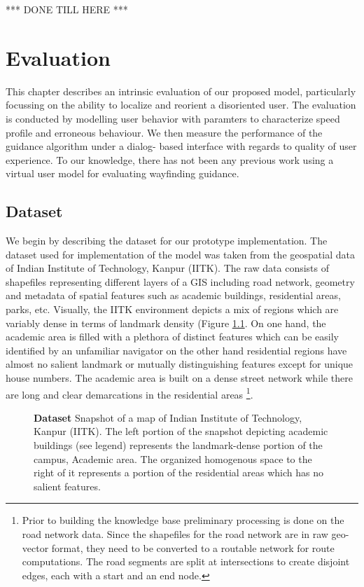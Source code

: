 \documentclass{iitkthesis}
\begin{document}
{*** DONE TILL HERE ***}
 \chapter{Evaluation}
This chapter describes an intrinsic evaluation of our proposed model, 
particularly focussing on the ability to localize and reorient a 
disoriented user. The evaluation is conducted by modelling user behavior 
with paramters to characterize speed profile and erroneous behaviour. We 
then measure the performance of the guidance algorithm under a dialog-
based interface with regards to quality of user experience. To our 
knowledge, there has not been any previous work using a virtual user 
model for evaluating wayfinding guidance. 
 
 \label{evaluation}
 \section{Dataset}
We begin by describing the dataset for our prototype implementation. The 
dataset used for implementation of the model was taken from the 
geospatial data of Indian Institute of Technology, Kanpur (IITK). The raw 
data consists of shapefiles representing different layers of a GIS 
including road network, geometry and metadata of spatial features such as 
academic buildings, residential areas, parks, etc. Visually, the IITK 
environment depicts a mix of regions which are variably dense in terms of 
landmark density (Figure \ref{fig:dataset}. On one hand, the academic 
area is filled with a plethora of distinct features which can be easily 
identified by an unfamiliar navigator on the other hand residential 
regions have almost no salient landmark or mutually distinguishing 
features except for unique house numbers. The 
academic area is built on a dense street network while there are long and 
clear demarcations in the residential areas
\footnote{Prior to building the knowledge base preliminary processing 
is done on the road network data. Since the shapefiles for the road network 
are in raw geo-vector format, they need to be converted to a routable 
network for route computations. The road segments are split at 
intersections to create disjoint edges, each with a start and an end node.}.
\begin{figure}
\centering
{}
\caption{\textbf{\textbf{Dataset}} Snapshot of a map of Indian 
Institute of Technology, Kanpur (IITK). The left portion of the snapshot 
depicting academic buildings (see legend) represents the landmark-dense 
portion of the campus, Academic area. The organized homogenous space to 
the right of it represents a portion of the residential areas which has 
no salient features.}
\label{fig:dataset}
 \end{figure} 
\end{document}
